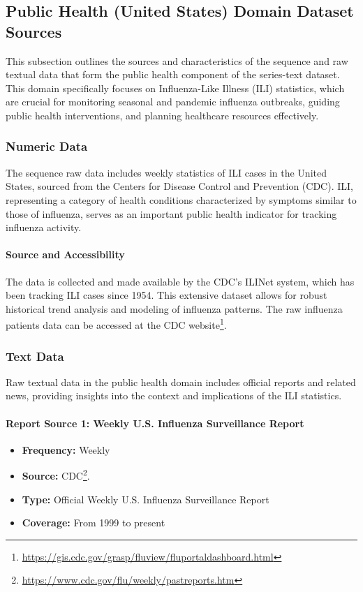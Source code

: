 \subsection{Public Health (United States) Domain Dataset Sources}

This subsection outlines the sources and characteristics of the sequence and raw textual data that form the public health component of the series-text dataset. This domain specifically focuses on Influenza-Like Illness (ILI) statistics, which are crucial for monitoring seasonal and pandemic influenza outbreaks, guiding public health interventions, and planning healthcare resources effectively.

\subsubsection{Numeric Data}
The sequence raw data includes weekly statistics of ILI cases in the United States, sourced from the Centers for Disease Control and Prevention (CDC). ILI, representing a category of health conditions characterized by symptoms similar to those of influenza, serves as an important public health indicator for tracking influenza activity.

\paragraph{Source and Accessibility}
The data is collected and made available by the CDC's ILINet system, which has been tracking ILI cases since 1954. This extensive dataset allows for robust historical trend analysis and modeling of influenza patterns. The raw influenza patients data can be accessed at the CDC website\footnote{\url{https://gis.cdc.gov/grasp/fluview/fluportaldashboard.html}}.

\subsubsection{Text Data}
Raw textual data in the public health domain includes official reports and related news, providing insights into the context and implications of the ILI statistics.

\paragraph{Report Source 1: Weekly U.S. Influenza Surveillance Report}
\begin{itemize}
    \item \textbf{Frequency:} Weekly
    \item \textbf{Source:} CDC\footnote{\url{https://www.cdc.gov/flu/weekly/pastreports.htm}}.
    \item \textbf{Type:} Official Weekly U.S. Influenza Surveillance Report
    \item \textbf{Coverage:} From 1999 to present
\end{itemize}

